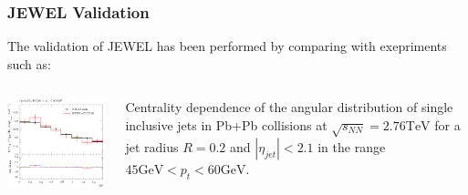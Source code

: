 \documentclass{beamer}
\begin{document}
\begin{frame}\frametitle{JEWEL Validation}
    \begin{minipage}{1\textwidth}
	The validation of JEWEL has been performed by comparing with exepriments such as:    
    \end{minipage}
    \begin{columns}
    \begin{column}{0.5\textwidth}
	\begin{minipage}[l]{0.5\textwidth}
	\includegraphics[scale=0.5]{images/atlas_jewel_1.png}
	\end{minipage}
	\end{column}
    \begin{column}{0.5\textwidth}
	\begin{minipage}[r]{1\textwidth}
	Centrality dependence of the angular distribution of single inclusive jets in Pb+Pb collisions
	at $\sqrt{s_{NN}}=2.76\mathrm{TeV}$ for a jet radius $R=0.2$ and $|\eta_{jet}|<2.1$ in the
	range $45\mathrm{GeV}<p_t<60\mathrm{GeV}$.
	\end{minipage}
	\end{column}
	\end{columns}
\end{frame}
\end{document}
